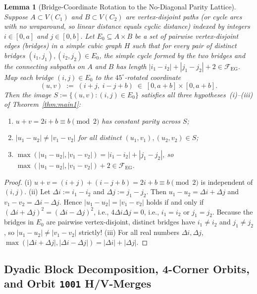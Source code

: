 \documentclass[11pt,reqno]{amsart}
\theoremstyle{plain}
\newtheorem{lemma}[theorem]{Lemma}
\theoremstyle{definition}
\theoremstyle{remark}
\newcommand{\FEG}{\mathcal{F}_{\mathrm{EG}}}
\DeclareRobustCommand{\_}{\ifmmode\text{\textunderscore}\else\textunderscore\allowbreak\fi}
\begin{document}
\begin{lemma}[Bridge-Coordinate Rotation to the No-Diagonal Parity Lattice]\label{lem:bridge-encoding}
Suppose $A \subset V(C_1)$ and $B \subset V(C_2)$ are vertex-disjoint paths (or cycle arcs with no wraparound, so linear distance equals cyclic distance) indexed by integers $i \in [0, a]$ and $j \in [0, b]$. Let $E_0 \subseteq A \times B$ be a set of pairwise vertex-disjoint edges (bridges) in a simple cubic graph $H$ such that for every pair of distinct bridges $(i_1, j_1), (i_2, j_2) \in E_0$, the simple cycle formed by the two bridges and the connecting subpaths on $A$ and $B$ has length $|i_1 - i_2| + |j_1 - j_2| + 2 \in \FEG$. Map each bridge $(i, j) \in E_0$ to the $45^\circ$-rotated coordinate
\[
  (u, v) \;:=\; (i + j,\; i - j + b) \;\in\; [0, a + b] \times [0, a + b].
\]
Then the image $S := \{(u, v) : (i, j) \in E_0\}$ satisfies all three hypotheses~(i)--(iii) of Theorem~\ref{thm:main1}:
\begin{enumerate}[label=(\roman*),leftmargin=2.2em]
  \item $u + v = 2i + b \equiv b \pmod{2}$ has constant parity across $S$;
  \item $|u_1 - u_2| \neq |v_1 - v_2|$ for all distinct $(u_1, v_1), (u_2, v_2) \in S$;
  \item $\max(|u_1 - u_2|, |v_1 - v_2|) = |i_1 - i_2| + |j_1 - j_2|$, so $\max(|u_1 - u_2|, |v_1 - v_2|) + 2 \in \FEG$.
\end{enumerate}
\end{lemma}

\begin{proof}
(i) $u + v = (i + j) + (i - j + b) = 2i + b \equiv b \pmod{2}$ is independent of $(i, j)$.
(ii) Let $\Delta i := i_1 - i_2$ and $\Delta j := j_1 - j_2$. Then $u_1 - u_2 = \Delta i + \Delta j$ and $v_1 - v_2 = \Delta i - \Delta j$. Hence $|u_1 - u_2| = |v_1 - v_2|$ holds if and only if $(\Delta i + \Delta j)^2 = (\Delta i - \Delta j)^2$, i.e., $4 \Delta i \Delta j = 0$, i.e., $i_1 = i_2$ or $j_1 = j_2$. Because the bridges in $E_0$ are pairwise vertex-disjoint, distinct bridges have $i_1 \neq i_2$ and $j_1 \neq j_2$, so $|u_1 - u_2| \neq |v_1 - v_2|$ strictly!
(iii) For all real numbers $\Delta i, \Delta j$, $\max(|\Delta i + \Delta j|, |\Delta i - \Delta j|) = |\Delta i| + |\Delta j|$.
\end{proof}

\subsection{Dyadic Block Decomposition, 4-Corner Orbits, and Orbit \texorpdfstring{\texttt{1001}}{1001} H/V-Merges}\label{subsec:dyadic-decomp}
\end{document}
